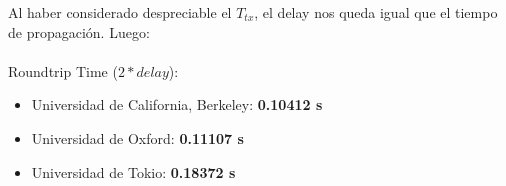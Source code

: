 Al haber considerado despreciable el $T_{tx}$, el delay nos queda igual que el tiempo de propagación. Luego:\\
\\
Roundtrip Time ($2 * delay$):
\begin{itemize}
	\item Universidad de California, Berkeley: \textbf{0.10412 s}
	\item Universidad de Oxford: \textbf{0.11107 s}
	\item Universidad de Tokio:  \textbf{0.18372 s}
\end{itemize}